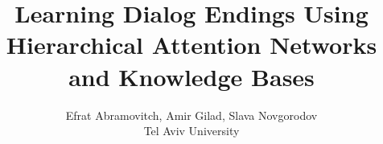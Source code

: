 \documentclass[9pt]{article}
\begin{document}
\title{
Learning Dialog Endings Using Hierarchical Attention Networks and Knowledge Bases}

\author{Efrat Abramovitch, Amir Gilad, Slava Novgorodov
\\ Tel Aviv University
 }
\maketitle








{\small

}
\end{document}
